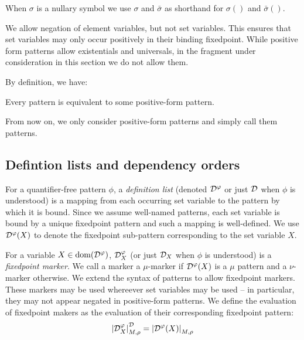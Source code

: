 When \(\sigma\) is a nullary symbol we use \(\sigma\) and \(\bar \sigma\) as shorthand for \(\sigma()\) and \(\bar \sigma()\).

We allow negation of element variables, but not set variables.
This ensures that set variables may only occur positively in their binding fixedpoint.
While positive form patterns allow existentials and universals,
in the fragment under consideration in this section we do not allow them.

By definition, we have:

\begin{lemma}
Every pattern is equivalent to some positive-form pattern.
\end{lemma}

From now on, we only consider positive-form patterns and simply call them
patterns.

\hypertarget{defintion-lists-and-dependency-orders}{%
\subsection{Defintion lists and dependency orders}\label{defintion-lists-and-dependency-orders}}

\begin{definition}For a quantifier-free pattern \(\phi\), a \emph{definition list}
(denoted \(\mathcal D^\varphi\) or just \(\mathcal D\) when \(\phi\) is understood)
is a mapping from each occurring set variable to the pattern by which it is bound.
Since we assume well-named patterns, each set variable is bound by a unique
fixedpoint pattern and such a mapping is well-defined.
We use \(\mathcal D^\varphi(X)\) to denote the fixedpoint sub-pattern corresponding to the set variable \(X\).\end{definition}

\begin{definition}For a variable \(X \in \mathrm{dom}(\mathcal D^\varphi)\),
\(\mathcal D^\varphi_X\) (or just \(\mathcal D_X\) when \(\phi\) is understood)
is a \emph{fixedpoint marker}.
We call a marker a \(\mu\)-marker if \(\mathcal D^\varphi(X)\) is a \(\mu\) pattern
and a \(\nu\)-marker otherwise.
We extend the syntax of patterns to allow fixedpoint markers. These markers may
be used whereever set variables may be used -- in particular, they may not
appear negated in positive-form patterns. We define the evaluation of fixedpoint
makers as the evaluation of their corresponding fixedpoint pattern:
\[\left| {\mathcal D^\varphi_X} \right|^\mathcal D_{M,\rho} = \left| {\mathcal D^\varphi(X)} \right|_{M,\rho}\]\end{definition}

